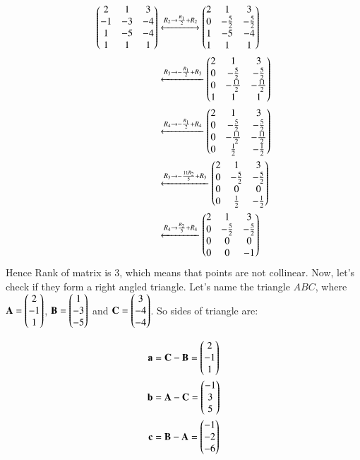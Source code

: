 \documentclass[journal,12pt,twocolumn]{IEEEtran}
\let\vec\mathbf
\begin{document}
\begin{enumerate}[start=17]
\begin{align}
 \begin{pmatrix}2&1&3\\-1&-3&-4\\1&-5&-4\\1&1&1\end{pmatrix} &\xleftrightarrow[]{R_2\rightarrow \frac{R_1}{2}+R_2} \begin{pmatrix}2&1&3\\0&-\frac{5}{2}&-\frac{5}{2}\\1&-5&-4\\1&1&1\end{pmatrix}\\
 &\xleftarrow[]{R_3\rightarrow -\frac{R_1}{2} + R_3} \begin{pmatrix}2&1&3\\0&-\frac{5}{2}&-\frac{5}{2}\\0&-\frac{11}{2}&-\frac{11}{2}\\1&1&1\end{pmatrix} \\
 &\xleftarrow[]{R_4\rightarrow -\frac{R_1}{2} + R_4} \begin{pmatrix}2&1&3\\0&-\frac{5}{2}&-\frac{5}{2}\\0&-\frac{11}{2}&-\frac{11}{2}\\0&\frac{1}{2}&-\frac{1}{2}\end{pmatrix} \\
 &\xleftarrow[]{R_3\rightarrow -\frac{11R_2}{5} + R_3} \begin{pmatrix}2&1&3\\0&-\frac{5}{2}&-\frac{5}{2}\\0&0&0\\0&\frac{1}{2}&-\frac{1}{2}\end{pmatrix} \\
 &\xleftarrow[]{R_4\rightarrow \frac{R_2}{5} + R_4} \begin{pmatrix}2&1&3\\0&-\frac{5}{2}&-\frac{5}{2}\\0&0&0\\0&0&-1\end{pmatrix} 
\end{align}
Hence Rank of matrix is 3, which means that points are not collinear. Now, let's check if they form a right angled triangle. \newline
Let's name the triangle $ABC$, where $\vec{A} = \myvec{2\\-1\\1}$, $\vec{B} = \myvec{1\\-3\\-5}$ and $\vec{C} = \myvec{3\\-4\\-4}$. So sides of triangle are:

\begin{align}
 \vec{a} &= \vec{C} - \vec{B} = \myvec{2\\-1\\1}\\
 \vec{b} &= \vec{A} - \vec{C} = \myvec{-1\\3\\5}\\
 \vec{c} &= \vec{B} - \vec{A} = \myvec{-1\\-2\\-6}
\end{align}


\end{enumerate}
\end{document}
